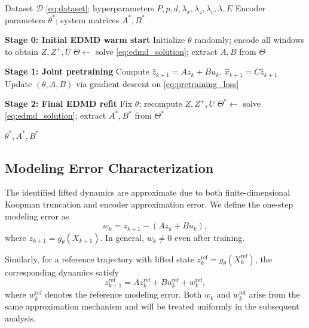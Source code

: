 \documentclass[journal]{IEEEtran}
\begin{document}
\begin{algorithm}[!t]
\caption{Transformer-Koopman Training Pipeline}
\label{alg:training}
\begin{algorithmic}[1]
\REQUIRE Dataset $\mathcal{D}$ \eqref{eq:dataset}; hyperparameters $P,p,d,\lambda_x,\lambda_z,\lambda_c,\lambda,E$
\ENSURE Encoder parameters $\theta^{*}$; system matrices $A^{*},B^{*}$

\STATE \textbf{Stage 0: Initial EDMD warm start}
\STATE Initialize $\theta$ randomly; encode all windows to obtain $Z,Z^{+},U$
\STATE $\Theta \leftarrow$ solve \eqref{eq:edmd_solution}; extract $A,B$ from $\Theta$

\STATE \textbf{Stage 1: Joint pretraining}
        \STATE Compute $\hat{z}_{k+1}=Az_k+Bu_k$, $\hat{x}_{k+1}=C\hat{z}_{k+1}$
        \STATE Update $(\theta,A,B)$ via gradient descent on \eqref{eq:pretraining_loss}
    \ENDFOR
\ENDFOR

\STATE \textbf{Stage 2: Final EDMD refit}
\STATE Fix $\theta$; recompute $Z,Z^{+},U$
\STATE $\Theta^{*} \leftarrow$ solve \eqref{eq:edmd_solution}; extract $A^{*},B^{*}$ from $\Theta^{*}$

\RETURN $\theta^{*}, A^{*}, B^{*}$
\end{algorithmic}
\end{algorithm}

\subsection{Modeling Error Characterization}
\label{subsec:modeling_error}

The identified lifted dynamics are approximate due to both finite-dimensional Koopman truncation and encoder approximation error. We define the one-step modeling error as
\begin{equation}
    w_k = z_{k+1} - (A z_k + B u_k),
    \label{eq:modeling_error}
\end{equation}
where $z_{k+1} = g_\theta(X_{k+1})$. In general, $w_k \neq 0$ even after training.

Similarly, for a reference trajectory with lifted state $z_k^{\mathrm{ref}} = g_\theta(X_k^{\mathrm{ref}})$, the corresponding dynamics satisfy
\begin{equation}
    z_{k+1}^{\mathrm{ref}} = A z_k^{\mathrm{ref}} + B u_k^{\mathrm{ref}} + w_k^{\mathrm{ref}},
    \label{eq:ref_error}
\end{equation}
where $w_k^{\mathrm{ref}}$ denotes the reference modeling error. Both $w_k$ and $w_k^{\mathrm{ref}}$ arise from the same approximation mechanism and will be treated uniformly in the subsequent analysis.
\end{document}
